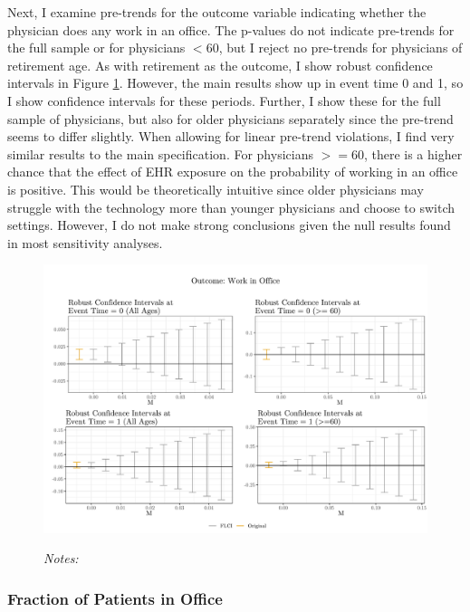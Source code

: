 \documentclass[12pt]{article}
\begin{document}
Next, I examine pre-trends for the outcome variable indicating whether the physician does any work in an office. The p-values do not indicate pre-trends for the full sample or for physicians $< 60$, but I reject no pre-trends for physicians of retirement age. As with retirement as the outcome, I show robust confidence intervals in Figure \ref{fig:pre_work}. However, the main results show up in event time 0 and 1, so I show confidence intervals for these periods. Further, I show these for the full sample of physicians, but also for older physicians separately since the pre-trend seems to differ slightly. When allowing for linear pre-trend violations, I find very similar results to the main specification. For physicians $>= 60$, there is a higher chance that the effect of EHR exposure on the probability of working in an office is positive. This would be theoretically intuitive since older physicians may struggle with the technology more than younger physicians and choose to switch settings. However, I do not make strong conclusions given the null results found in most sensitivity analyses. 

\begin{figure}[ht]
    \centering
    \captionsetup{width=.5\linewidth}
    \caption{}
    \includegraphics[scale=.5]{Objects/work_pretrends_plot.pdf}
    \label{fig:pre_work}
    \vspace{2mm}
    \caption*{\footnotesize{\textit{Notes:}}}
\end{figure}

\subsubsection{Fraction of Patients in Office}
\end{document}
